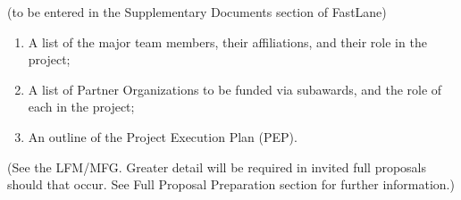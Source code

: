 \documentclass[oneside,11pt]{amsart}
\begin{document}


(to be entered in the Supplementary Documents section of FastLane)

\begin{enumerate}
%
\item A list of the major team members, their affiliations, and their
role in the project;
%
\item A list of Partner Organizations to be funded via subawards, and
the role of each in the project;
%
\item An outline of the Project Execution Plan (PEP).
\end{enumerate}

(See the LFM/MFG. Greater detail will be required in invited full
proposals should that occur. See Full Proposal Preparation section for
further information.)

\end{document}
